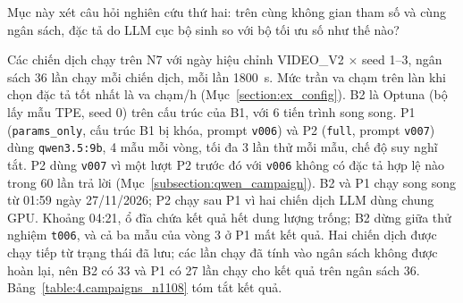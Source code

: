 \documentclass[../main.tex]{subfiles}
\begin{document}
Mục này xét câu hỏi nghiên cứu thứ hai: trên cùng không gian tham số và cùng ngân sách, đặc tả do LLM cục bộ sinh so với bộ tối ưu số như thế nào?

Các chiến dịch chạy trên N7 với ngày hiệu chỉnh VIDEO\_V2 $\times$ seed 1--3, ngân sách 36 lần chạy mỗi chiến dịch, mỗi lần 1800~s. Mức trần va chạm trên làn khi chọn đặc tả tốt nhất là  va chạm/h (Mục~\ref{section:ex_config}). B2 là Optuna (bộ lấy mẫu TPE, seed 0) trên cấu trúc của B1, với 6 tiến trình song song. P1 (\texttt{params\_only}, cấu trúc B1 bị khóa, prompt \texttt{v006}) và P2 (\texttt{full}, prompt \texttt{v007}) dùng \texttt{qwen3.5:9b}, 4 mẫu mỗi vòng, tối đa 3 lần thử mỗi mẫu, chế độ suy nghĩ tắt. P2 dùng \texttt{v007} vì một lượt P2 trước đó với \texttt{v006} không có đặc tả hợp lệ nào trong 60 lần trả lời (Mục~\ref{subsection:qwen_campaign}). B2 và P1 chạy song song từ 01:59 ngày 27/11/2026; P2 chạy sau P1 vì hai chiến dịch LLM dùng chung GPU. Khoảng 04:21, ổ đĩa chứa kết quả hết dung lượng trống; B2 dừng giữa thử nghiệm \texttt{t006}, và cả ba mẫu của vòng 3 ở P1 mất kết quả. Hai chiến dịch được chạy tiếp từ trạng thái đã lưu; các lần chạy đã tính vào ngân sách không được hoàn lại, nên B2 có 33 và P1 có 27 lần chạy cho kết quả trên ngân sách 36. Bảng~\ref{table:4.campaigns_n1108} tóm tắt kết quả.
\end{document}
